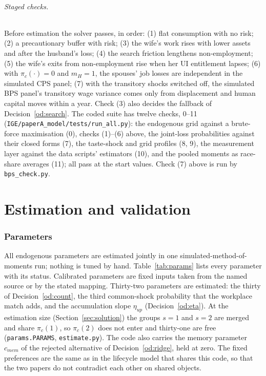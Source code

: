 \documentclass[11pt]{article}
\newcommand{\code}[1]{\texttt{#1}}
\newcommand{\1}{\mathbf{1}}
\begin{document}
\paragraph{Staged checks.} Before estimation the solver passes, in order: (1) flat consumption with no risk; (2) a
precautionary buffer with risk; (3) the wife's work rises with lower assets and after the husband's loss; (4) the search
friction lengthens non-employment; (5) the wife's exits from non-employment rise when her UI entitlement lapses;
(6) with $\pi_c(\cdot) = 0$ and $m_H = 1$, the spouses' job losses are independent in the simulated CPS panel; (7) with
the transitory shocks switched off, the simulated BPS panel's transitory wage variance comes only from displacement and
human capital moves within a year. Check (3) also decides the fallback of Decision~\ref{od:search}. The coded suite
has twelve checks, 0--11 (\code{IGE/paperA\_model/tests/run\_all.py}): the endogenous grid against a brute-force
maximisation (0), checks (1)--(6) above, the joint-loss probabilities against their closed forms (7), the taste-shock
and grid profiles (8, 9), the measurement layer against the data scripts' estimators (10), and the pooled moments as
race-share averages (11); all pass at the start values. Check (7) above is run by \code{bps\_check.py}.

\part{Estimation and validation}

\section{Parameters}\label{sec:params}

All endogenous parameters are estimated jointly in one simulated-method-of-moments run; nothing is tuned by hand.
Table~\ref{tab:params} lists every parameter with its status. Calibrated parameters are fixed inputs taken from the
named source or by the stated mapping. Thirty-two parameters are estimated: the thirty of Decision~\ref{od:count},
the third common-shock probability that the workplace match adds, and the accumulation slope $\eta_{up}$
(Decision~\ref{od:eta}). At the estimation size (Section~\ref{sec:solution}) the groups $s = 1$ and $s = 2$ are merged
and share $\pi_c(1)$, so $\pi_c(2)$ does not enter and thirty-one are free (\code{params.PARAMS},
\code{estimate.py}). The code also carries the memory parameter $c_{mem}$ of the rejected alternative of
Decision~\ref{od:ridge}, held at zero. The
fixed preferences are the same as in the lifecycle model that shares this code, so that the two papers do not
contradict each other on shared objects.
\end{document}
